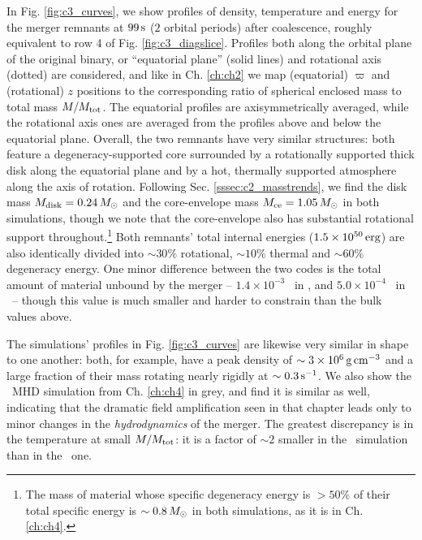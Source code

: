 In Fig. \ref{fig:c3_curves}, we show profiles of density, temperature and energy for the merger remnants at $99\,\mathrm{s}$ ($2$ orbital periods) after coalescence, roughly equivalent to row 4 of Fig. \ref{fig:c3_diagslice}.  Profiles both along the orbital plane of the original binary, or ``equatorial plane'' (solid lines) and rotational axis (dotted) are considered, and like in Ch. \ref{ch:ch2} we map (equatorial) $\varpi$ and (rotational) $z$ positions to the corresponding ratio of spherical enclosed mass to total mass $M/M_{\rm tot}$.  The equatorial profiles are axisymmetrically averaged, while the rotational axis ones are averaged from the profiles above and below the equatorial plane.  Overall, the two remnants have very similar structures: both feature a degeneracy-supported core surrounded by a rotationally supported thick disk along the equatorial plane and by a hot, thermally supported atmosphere along the axis of rotation.  Following Sec. \ref{sssec:c2_masstrends}, we find the disk mass $\Mdisk = 0.24\,\Msun$ and the core-envelope mass $\Mrem = 1.05\,\Msun$ in both simulations, though we note that the core-envelope also has substantial rotational support throughout.\footnote{The mass of material whose specific degeneracy energy is $>50$\% of their total specific energy is $\sim0.8\,\Msun$ in both simulations, as it is in Ch. \ref{ch:ch4}.}  Both remnants' total internal energies ($1.5\times10^{50}\,\mathrm{erg}$) are also identically divided into $\sim30$\% rotational, $\sim10$\% thermal and $\sim60$\% degeneracy energy.  One minor difference between the two codes is the total amount of material unbound by the merger -- $1.4\times10^{-3}$ \Msun\ in \gasoline, and $5.0\times10^{-4}$ \Msun\ in \arepo\ -- though this value is much smaller and harder to constrain than the bulk values above.



The simulations' profiles in Fig. \ref{fig:c3_curves} are likewise very similar in shape to one another: both, for example, have a peak density of $\sim3\times10^6\,\gcc$ and a large fraction of their mass rotating nearly rigidly at $\sim0.3\,\psec$.  We also show the \arepo\ MHD simulation from Ch. \ref{ch:ch4} in grey, and find it is similar as well, indicating that the dramatic field amplification seen in that chapter leads only to minor changes in the \textit{hydrodynamics} of the merger.  The greatest discrepancy is in the temperature at small $M/M_{\rm tot}$: it is a factor of $\sim2$ smaller in the \arepo\ simulation than in the \gasoline\ one.

